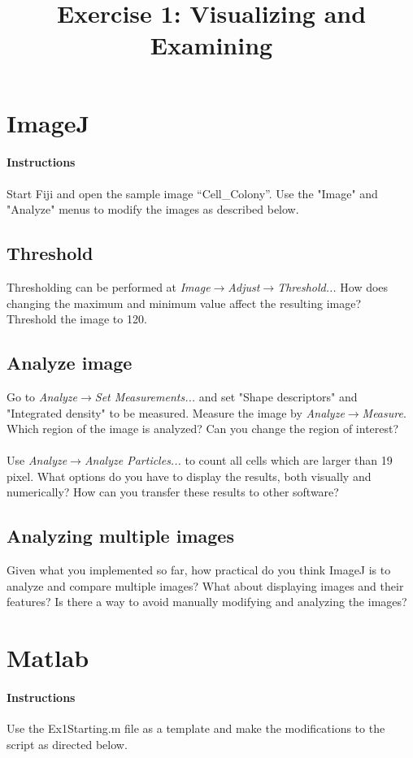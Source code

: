 \documentclass{article}
\begin{document}
\title{Exercise 1: Visualizing and Examining}

\section{ImageJ}
\paragraph{Instructions} Start Fiji and open the sample image "`Cell\_Colony"'. Use the "Image" and "Analyze" menus to modify the images as described below.

\subsection{Threshold}
Thresholding can be performed at \textit{Image$\rightarrow$Adjust$\rightarrow$Threshold...} How does changing the maximum and minimum value affect the resulting image?\\
Threshold the image to 120.

\subsection{Analyze image}
Go to \textit{Analyze$\rightarrow$Set Measurements...} and set "Shape descriptors" and "Integrated density" to be measured. Measure the image by \textit{Analyze$\rightarrow$Measure}. Which region of the image is analyzed? Can you change the region of interest?\\
\\
Use \textit{Analyze$\rightarrow$Analyze Particles...} to count all cells which are larger than 19 pixel. What options do you have to display the results, both visually and numerically? How can you transfer these results to other software?

\subsection{Analyzing multiple images}
Given what you implemented so far, how practical do you think ImageJ is to analyze and compare multiple images? What about displaying images and their features? Is there a way to avoid manually modifying and analyzing the images?

\section{Matlab}
\paragraph{Instructions} Use the Ex1Starting.m file as a template and make the modifications to the script as directed below.
\end{document}
